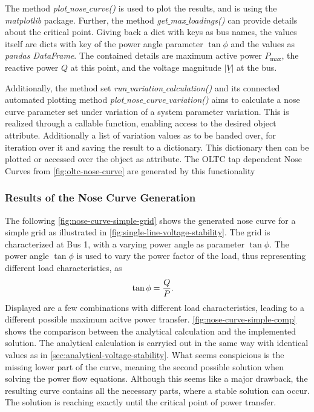 The method {\itshape plot$\_$nose$\_$curve()} is used to plot the results, and is using the {\itshape matplotlib} package.
Further, the method {\itshape get$\_$max$\_$loadings()} can provide details about the critical point.
Giving back a dict with keys as bus names, the values itself are dicts with key of the power angle parameter $\tan \phi$ and the values as {\itshape pandas DataFrame}.
The contained details are maximum active power $P_\mathrm{max}$, the reactive power $Q$ at this point, and the voltage magnitude $\vert \underline{V} \vert$ at the bus.

Additionally, the method set \textit{run$\_$variation$\_$calculation()} and its connected automated plotting method \textit{plot$\_$nose$\_$curve$\_$variation()} aims to calculate a nose curve parameter set under variation of a system parameter variation.
This is realized through a callable function, enabling access to the desired object attribute.
Additionally a list of variation values as to be handed over, for iteration over it and saving the result to a dictionary.
This dictionary then can be plotted or accessed over the object as attribute.
The \acs{OLTC} tap dependent Nose Curves from \autoref{fig:oltc-nose-curve} are generated by this functionality

\subsubsection{Results of the Nose Curve Generation}

The following \autoref{fig:nose-curve-simple-grid} shows the generated nose curve for a simple grid as illustrated in \autoref{fig:single-line-voltage-stability}.
The grid is characterized at Bus 1, with a varying power angle as parameter $\tan \phi$.
The power angle $\tan \phi$ is used to vary the power factor of the load, thus representing different load characteristics, as
\begin{align}
        \tan \phi &= \frac{Q}{P}. \notag %
\end{align}
Displayed are a few combinations with different load characteristics, leading to a different possible maximum acitve power transfer.
\autoref{fig:nose-curve-simple-comp} shows the comparison between the analytical calculation and the implemented solution.
The analytical calculation is carryied out in the same way with identical values as in \autoref{sec:analytical-voltage-stability}.
What seems conspicious is the missing lower part of the curve, meaning the second possible solution when solving the power flow equations.
Although this seems like a major drawback, the resulting curve contains all the necessary parts, where a stable solution can occur. \autocite{cutsem_1998}
The solution is reaching exactly until the critical point of power transfer.

